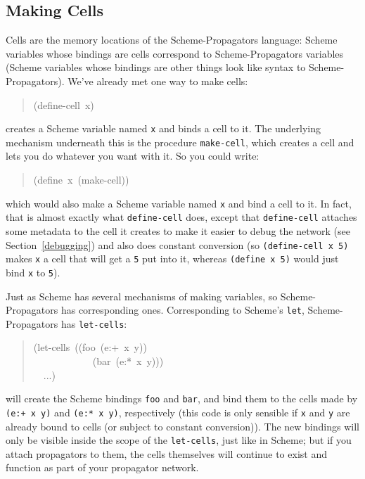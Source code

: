 \documentclass[12pt,letterpaper,english]{article}
\begin{document}
\hypertarget{making-cells}{}
\subsection{Making Cells}
\label{making-cells}

Cells are the memory locations of the Scheme-Propagators
language: Scheme variables whose bindings are cells correspond to
Scheme-Propagators variables (Scheme variables whose bindings are
other things look like syntax to Scheme-Propagators).  We've
already met one way to make cells:
\begin{quote}{\ttfamily \raggedright \noindent
(define-cell~x)
}\end{quote}
creates a Scheme variable named \texttt{x} and binds a cell to it.  The
underlying mechanism underneath this is the procedure \texttt{make-cell},
which creates a cell and lets you do whatever you want with it.  So
you could write:
\begin{quote}{\ttfamily \raggedright \noindent
(define~x~(make-cell))
}\end{quote}
which would also make a Scheme variable named \texttt{x} and bind a cell to
it.  In fact, that is almost exactly what \texttt{define-cell} does, except
that \texttt{define-cell} attaches some metadata to the cell it creates to
make it easier to debug the network (see Section~\ref{debugging})
and also does constant
conversion (so \texttt{(define-cell x 5)} makes \texttt{x} a cell that will get
a \texttt{5} put into it, whereas \texttt{(define x 5)} would just bind \texttt{x} to
\texttt{5}).

Just as Scheme has several mechanisms of making variables, so
Scheme-Propagators has corresponding ones.  Corresponding to Scheme's
\texttt{let}, Scheme-Propagators has \texttt{let-cells}:
\begin{quote}{\ttfamily \raggedright \noindent
(let-cells~((foo~(e:+~x~y))~\\
~~~~~~~~~~~~(bar~(e:*~x~y)))~\\
~~...)
}\end{quote}
will create the Scheme bindings \texttt{foo} and \texttt{bar}, and bind them to
the cells made by \texttt{(e:+ x y)} and \texttt{(e:* x y)}, respectively (this
code is only sensible if \texttt{x} and \texttt{y} are already bound to cells
(or subject to constant conversion)).  The new bindings will only be
visible inside the scope of the \texttt{let-cells}, just like in Scheme;
but if you attach propagators to them, the cells themselves will
continue to exist and function as part of your propagator network.
\end{document}
